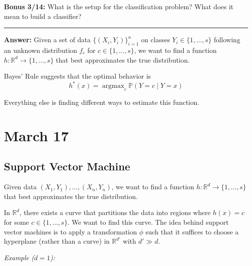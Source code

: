 \documentclass[12pt]{report}
\renewcommand{\P}{\mathbb{P}}
\newcommand{\R}{\mathbb{R}}
\renewcommand{\div}{\vspace*{10pt}\hrule\vspace*{10pt}}
\newcommand*{\tbf}[1]{\ifmmode\mathbf{#1}\else\textbf{#1}\fi}
\DeclareMathOperator*{\argmax}{\arg\max}
\newenvironment*{exercise}[1][red]{
    \begin{tcolorbox}[
        parbox=false,
        colback=#1!5!white,
        colframe=#1!75!black,
        breakable
    ]}
    {\end{tcolorbox}}
\begin{document}
\begin{exercise}
	\textbf{Bonus 3/14:} What is the setup for the classification problem? What does it mean to build a classifier?

	\div

	\tbf{Answer:} Given a set of data $\{(X_i, Y_i)\}_{i=1}^n$ on classes $Y_i \in \{1, \dots, s\}$ following an unknown distribution $f_c$ for $c \in \{1, \dots, s\}$, we want to find a function $h: \R^d \to \{1, \dots, s\}$ that best approximates the true distribution.

	Bayes' Rule suggests that the optimal behavior is
	\[h^*(x) = \argmax_c \P(Y = c \; | \; Y = x)\]

	Everything else is finding different ways to estimate this function.
\end{exercise}

\section{March 17}
\subsection{Support Vector Machine}

Given data $(X_1, Y_1), \dots, (X_n, Y_n)$, we want to find a function $h: \R^d \to \{1, \dots, s\}$ that best approximates the true distribution.

In $\R^d$, there exists a curve that partitions the data into regions where $h(x) = c$ for some $c \in \{1, \dots, s\}$. We want to find this curve. The idea behind support vector machines is to apply a transformation $\phi$ such that it suffices to choose a hyperplane (rather than a curve) in $\R^{d'}$ with $d' \gg d$.

\emph{Example ($d=1$):}
\end{document}
